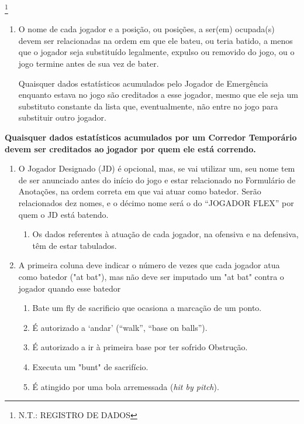 \footnote{N.T.: REGISTRO DE DADOS }
\begin{multicols}{2} 
	
	\begin{enumerate}[label=\alph*)]
		\item O nome de cada jogador e a posição, ou posições, a ser(em) ocupada(s) devem ser relacionadas na ordem em que ele bateu, ou teria batido, a menos que o jogador seja substituído legalmente, expulso ou removido do jogo, ou o jogo termine antes de sua vez de bater.
		
		Quaisquer dados estatísticos acumulados pelo Jogador de Emergência enquanto estava no jogo são creditados a esse jogador, mesmo que ele seja um substituto constante da lista que, eventualmente, não entre no jogo para substituir outro jogador. 
	\end{enumerate}
	\textbf{Quaisquer dados estatísticos acumulados por um Corredor Temporário devem ser creditados ao jogador por quem ele está correndo.} 
	\begin{enumerate}[label= \arabic*)]
		\item  O Jogador Designado (JD) é opcional, mas, se vai utilizar um, seu nome tem de ser anunciado antes do início do jogo e estar relacionado no Formulário de Anotações, na ordem correta em que vai atuar como batedor. Serão relacionados dez nomes, e o décimo nome será o do “JOGADOR FLEX” por quem o JD está batendo. 
		\begin{enumerate}[label=(\alph*)]
			\item Os dados referentes à atuação de cada jogador, na ofensiva e na defensiva, têm de 
			estar tabulados. 
		\end{enumerate}
		\item A primeira coluna deve indicar o número de vezes que cada jogador atua como batedor ("at bat"), mas não deve ser imputado um "at bat" contra o jogador quando esse batedor 
		\begin{enumerate}[label= (\alph*)]
			\item Bate um \gls{fly de sacrificio} que ocasiona a marcação de um ponto. 
			\item É autorizado a ‘andar’ (“walk”, “base on balls”). 
			\item É autorizado a ir à primeira base por ter sofrido Obstrução. 
			\item Executa um "bunt" de sacrifício. 
			\item É atingido por uma bola arremessada (\textit{hit by pitch}). 
		\end{enumerate}

\end{enumerate}
\end{multicols}
